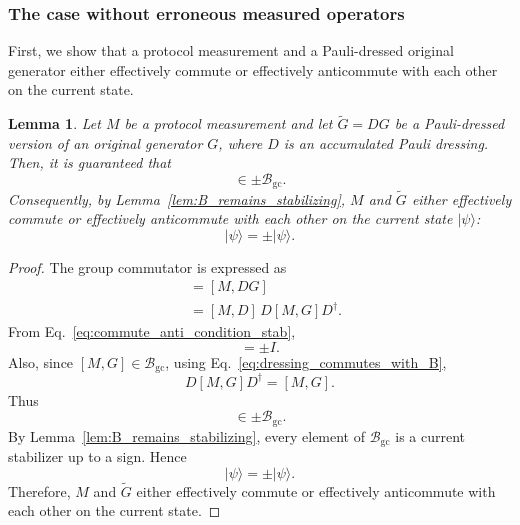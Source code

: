 \documentclass[
 reprint,
 amsmath,amssymb,
 pra,superscriptaddress, nofootinbib
]{revtex4-2}
\newtheorem{lemma}{Lemma}
\theoremstyle{definition}
\theoremstyle{plain}
\begin{document}
\subsubsection{The case without erroneous measured operators}
First, we show that a protocol measurement and a Pauli-dressed original generator either effectively commute or effectively anticommute with each other on the current state.

\begin{lemma}
\label{lem:dressed_generator_commutator}
Let $M$ be a protocol measurement and let $\tilde{G}=DG$ be a Pauli-dressed version of an original generator $G$, where $D$ is an accumulated Pauli dressing.
Then, it is guaranteed that
\begin{equation}
  [M,\tilde{G}]\in\pm\mathcal{B}_{\mathrm{gc}}.
\end{equation}
Consequently, by Lemma~\ref{lem:B_remains_stabilizing}, $M$ and $\tilde{G}$ either effectively commute or effectively anticommute with each other on the current state $|\psi\rangle$:
\begin{equation}
  [M,\tilde{G}]|\psi\rangle=\pm|\psi\rangle.
\end{equation}
\end{lemma}

\begin{proof}
The group commutator is expressed as
\begin{align}
  [M,\tilde{G}]
  &=
  [M,DG]\\
  &=
  [M,D]\,D[M,G]D^\dagger .
\end{align}
From Eq.~\eqref{eq:commute_anti_condition_stab},
\begin{equation}
  [M,D]=\pm I.
\end{equation}
Also, since $[M,G]\in \mathcal{B}_{\mathrm{gc}}$, using Eq.~\eqref{eq:dressing_commutes_with_B},
\begin{equation}
  D[M,G]D^\dagger=[M,G].
\end{equation}
Thus
\begin{equation}
  [M,\tilde{G}]\in\pm\mathcal{B}_{\mathrm{gc}}.
\end{equation}
By Lemma~\ref{lem:B_remains_stabilizing}, every element of $\mathcal{B}_{\mathrm{gc}}$ is a current stabilizer up to a sign. 
Hence
\begin{equation}
  [M,\tilde{G}]|\psi\rangle=\pm|\psi\rangle.
\end{equation}
Therefore, $M$ and $\tilde{G}$ either effectively commute or effectively anticommute with each other on the current state.
\end{proof}
\end{document}
